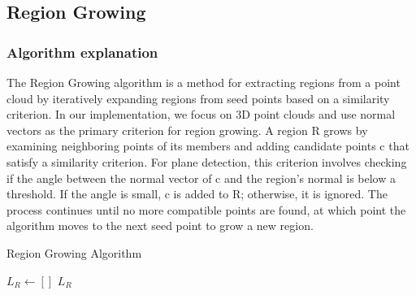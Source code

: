 \documentclass[a4paper,9pt]{article}
\begin{document}






\newpage

\subsection{Region Growing}
\subsubsection{Algorithm explanation}
The Region Growing algorithm is a method for extracting regions from a point cloud by iteratively expanding regions from seed points based on a similarity criterion. In our implementation, we focus on 3D point clouds and use normal vectors as the primary criterion for region growing. A region R grows by examining neighboring points of its members and adding candidate points c that satisfy a similarity criterion. For plane detection, this criterion involves checking if the angle between the normal vector of c and the region's normal is below a threshold. If the angle is small, c is added to 
R; otherwise, it is ignored. The process continues until no more compatible points are found, at which point the algorithm moves to the next seed point to grow a new region. 

\begin{algorithm}[H]
\caption{Region Growing Algorithm}
\label{alg:region_growing}

\( L_R \leftarrow [ ] \)\;
\Return \( L_R \)
\end{algorithm}
\end{document}
